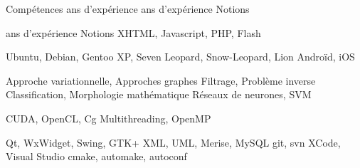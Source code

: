 
\begin{rubric}{Compétences}
   ans d'expérience
   ans d'expérience
   Notions
  
   ans d'expérience
   Notions
   XHTML, Javascript, PHP, Flash
  
  \entry*[Linux] Ubuntu, Debian, Gentoo
  \entry*[Windows] XP, Seven 
  \entry*[Apple] Leopard, Snow-Leopard, Lion
  \entry*[Mobile] Androïd, iOS
  
  \entry*[Modélisation] Approche variationnelle, Approches graphes
  \entry*[Restauration] Filtrage, Problème inverse
  \entry*[Segmentation] Classification, Morphologie mathématique
  \entry*[Apprentissage] Réseaux de neurones, SVM
  
   CUDA, OpenCL, Cg
   Multithreading, OpenMP
  
  \entry*[IHM] Qt, WxWidget, Swing, GTK+
   XML, UML, Merise, MySQL
  \entry*[Versionning] git, svn
  \entry*[IDE] XCode, Visual Studio
  \entry*[Autres] cmake, automake, autoconf
  
  \end{rubric}

